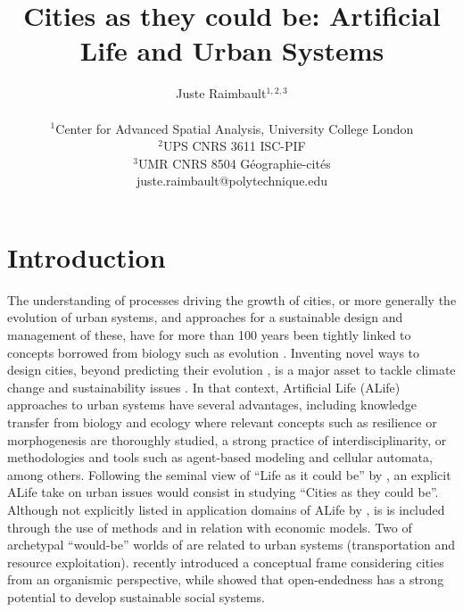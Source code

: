 \documentclass[letterpaper]{article}
\title{Cities as they could be: Artificial Life and Urban Systems}
\author{Juste Raimbault$^{1,2,3}$\\
\mbox{}\\
$^1$Center for Advanced Spatial Analysis, University College London\\
$^2$UPS CNRS 3611 ISC-PIF\\
$^3$UMR CNRS 8504 G{\'e}ographie-cit{\'e}s\\
juste.raimbault@polytechnique.edu} %
\begin{document}
\maketitle

\begin{abstract}
  
\end{abstract}



\section{Introduction}


The understanding of processes driving the growth of cities, or more generally the evolution of urban systems, and approaches for a sustainable design and management of these, have for more than 100 years been tightly linked to concepts borrowed from biology such as evolution \citep{batty2009centenary}. Inventing novel ways to design cities, beyond predicting their evolution \citep{batty2018inventing}, is a major asset to tackle climate change and sustainability issues \citep{iepsfc2018science}. In that context, Artificial Life (ALife) approaches to urban systems have several advantages, including knowledge transfer from biology and ecology where relevant concepts such as resilience or morphogenesis are thoroughly studied, a strong practice of interdisciplinarity, or methodologies and tools such as agent-based modeling and cellular automata, among others. Following the seminal view of ``Life as it could be'' by \cite{langton1986studying}, an explicit ALife take on urban issues would consist in studying ``Cities as they could be''. Although not explicitly listed in application domains of ALife by \cite{kim2006comprehensive}, is is included through the use of methods and in relation with economic models. Two of archetypal ``would-be'' worlds of \cite{casti1997would} are related to urban systems (transportation and resource exploitation). \cite{doi:10.1162/isala00135} recently introduced a conceptual frame considering cities from an organismic perspective, while \cite{doi:10.1162/isala00134} showed that open-endedness has a strong potential to develop sustainable social systems.
\end{document}
